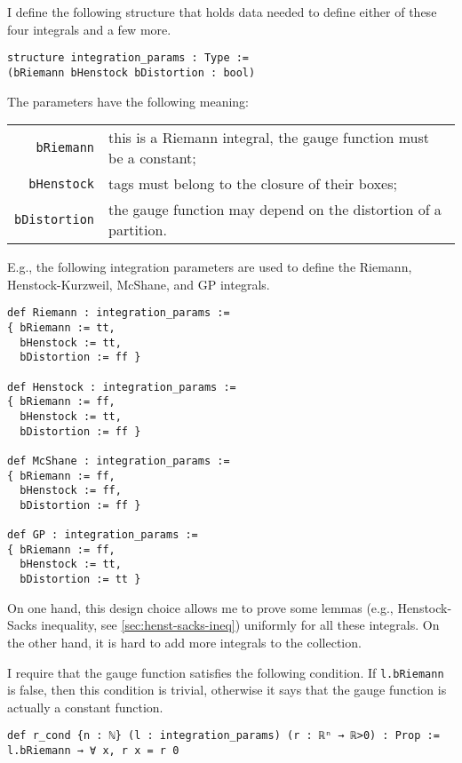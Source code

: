 \documentclass[a4paper, UKenglish,cleveref, autoref, thm-restate]{lipics-v2021}
\begin{document}
I define the following structure that holds data needed to define
either of these four integrals and a few more.

\begin{lstlisting}
structure integration_params : Type :=
(bRiemann bHenstock bDistortion : bool)
\end{lstlisting}

The parameters have the following meaning:

\noindent%
\begin{tabular}{rp{10cm}}
  \lstinline=bRiemann=&this is a Riemann integral, the gauge function must be a constant;\\
  \lstinline=bHenstock=&tags must belong to the closure of their boxes;\\
  \lstinline=bDistortion=&the gauge function may depend on the distortion of a partition.
\end{tabular}

E.g., the following integration parameters are used to define the
Riemann, Henstock-Kurzweil, McShane, and GP integrals.
\begin{lstlisting}[caption={Parameters corresponding to well-known integrals}]
def Riemann : integration_params :=
{ bRiemann := tt,
  bHenstock := tt,
  bDistortion := ff }

def Henstock : integration_params :=
{ bRiemann := ff,
  bHenstock := tt,
  bDistortion := ff }

def McShane : integration_params :=
{ bRiemann := ff,
  bHenstock := ff,
  bDistortion := ff }

def GP : integration_params :=
{ bRiemann := ff,
  bHenstock := tt,
  bDistortion := tt }
\end{lstlisting}

On one hand, this design choice allows me to prove some lemmas (e.g.,
Henstock-Sacks inequality, see \autoref{sec:henst-sacks-ineq})
uniformly for all these integrals. On the other hand, it is hard to
add more integrals to the collection.

I require that the gauge function satisfies the following
condition. If \lstinline=l.bRiemann= is false, then this condition is
trivial, otherwise it says that the gauge function is actually a
constant function.

\begin{lstlisting}[caption={Condition on the gauge function}]
def r_cond {n : ℕ} (l : integration_params) (r : ℝⁿ → ℝ>0) : Prop :=
l.bRiemann → ∀ x, r x = r 0
\end{lstlisting}
\end{document}
